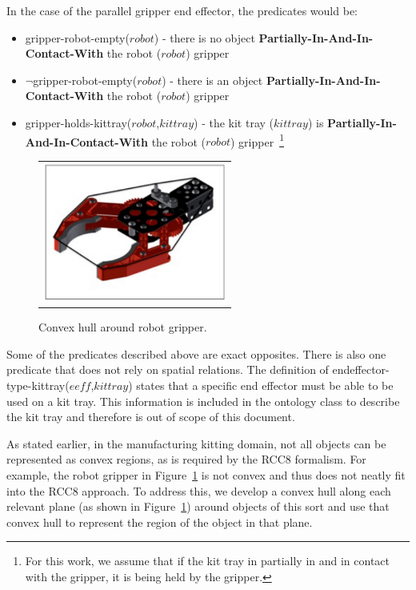 \documentclass[preprint,12pt]{elsarticle}
\newcommand{\const}[1] {$\mathit{#1}$}
\newcommand{\stvar}[1] {\textsf{#1}}
\begin{document}
In the case of the parallel gripper end effector, the predicates would be:
\begin{itemize}
\item \stvar{gripper-robot-empty}(\const{robot}) - there is no object \textbf{Partially-In-And-In-Contact-With} the robot (\const{robot}) gripper
\item $\neg$\stvar{gripper-robot-empty}(\const{robot}) - there is an object \textbf{Partially-In-And-In-Contact-With} the robot (\const{robot}) gripper
\item \stvar{gripper-holds-kittray}(\const{robot},\const{kittray}) - the kit tray (\const{kittray}) is \textbf{Partially-In-And-In-Contact-With} the robot (\const{robot}) gripper~\footnote{For this work, we assume that if the kit tray in partially in and in contact with the gripper, it is being held by the gripper.}
\end{itemize}
\begin{figure}[h!t!]
\begin{center}
\begin{tabular}{c}
\includegraphics[width=6cm]{gripper.pdf}
\end{tabular}
\end{center}
\caption{Convex hull around robot gripper.}
\label{fig:gripper}
\end{figure}
Some of the predicates described above  are exact opposites. There is also one predicate that does not rely on spatial relations. The definition of \stvar{endeffector-type-kittray}(\const{eeff},\const{kittray}) states that a specific end effector must be able to be used on a kit tray. This information is included in the ontology class to describe the kit tray and therefore is out of scope of this document.

As stated earlier, in the manufacturing kitting domain, not all objects can be represented as convex regions, as is required by the RCC8 formalism. For example, the robot gripper in Figure~\ref{fig:gripper} is not convex and thus does not neatly fit into the RCC8 approach. To address this, we develop a convex hull along each relevant plane (as shown in Figure~\ref{fig:gripper}) around objects of this sort and use that convex hull to represent the region of the object in that plane.
\end{document}
